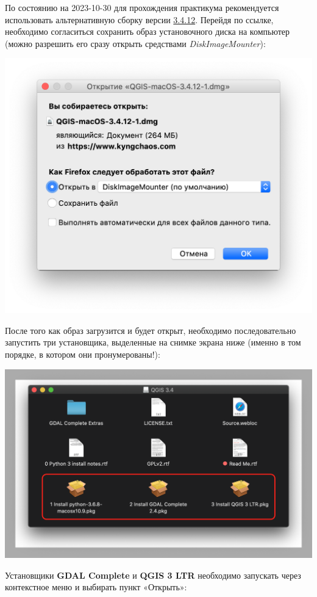 \documentclass[
  12pt,
]{book}
\begin{document}
По состоянию на 2023-10-30 для прохождения практикума рекомендуется использовать альтернативную сборку версии \href{https://www.kyngchaos.com/files/software/qgis/QGIS-macOS-3.4.12-1.dmg}{3.4.12}. Перейдя по ссылке, необходимо согласиться сохранить образ установочного диска на компьютер (можно разрешить его сразу открыть средствами \emph{DiskImageMounter}):

\includegraphics{images/Index0/mac01.png}

После того как образ загрузится и будет открыт, необходимо последовательно запустить три установщика, выделенные на снимке экрана ниже (именно в том порядке, в котором они пронумерованы!):

\includegraphics{images/Index0/mac02.png}

Установщики \textbf{GDAL Complete} и \textbf{QGIS 3 LTR} необходимо запускать через контекстное меню и выбирать пункт «Открыть»:
\end{document}
